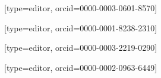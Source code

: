 \documentclass[a4paper,fleqn]{cas-sc}
\begin{document}





\author[2]{Nuno M. Delgado}[type=editor,
                        orcid=0000-0003-0601-8570]



\author[3,4]{Amaro G. {Barreto Jr.}}[type=editor,
                        orcid=0000-0001-8238-2310]



\author[6,7]{Erick Giovani Sperandio Nascimento}[type=editor,
                        orcid=0000-0003-2219-0290]




\author[1]{Idelfonso B. R. Nogueira}[type=editor,
                        orcid=0000-0002-0963-6449]



\end{document}
